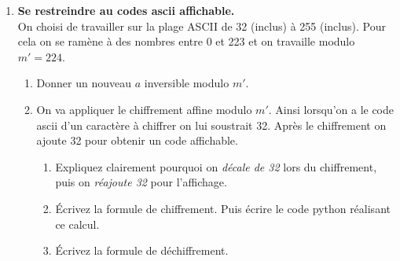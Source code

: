 \documentclass[12pt,a4paper]{article}
\begin{document}
\begin{enumerate}
  \item \textbf{Se restreindre au codes ascii affichable.}\\
  On choisi de travailler sur la plage ASCII de 32 (inclus) à 255 (inclus).
  Pour cela on se ramène à des nombres entre 0 et 223 et on travaille modulo $m'=224$.
  \begin{enumerate}
    \item Donner un nouveau $a$ inversible modulo $m'$.
    \item On va appliquer le chiffrement affine modulo $m'$.
    Ainsi lorsqu'on a le code ascii d'un caractère à chiffrer on lui soustrait 32.
    Après le chiffrement on ajoute 32 pour obtenir un code affichable.
    \begin{enumerate}
        \item Expliquez clairement pourquoi on \emph{décale de 32} lors du chiffrement, puis on \emph{réajoute 32} pour l’affichage.
        \item Écrivez la formule de chiffrement. Puis écrire le code python réalisant ce calcul.
        \item Écrivez la formule de déchiffrement.%
    \end{enumerate}
  \end{enumerate}


  


\end{enumerate}
\end{document}
